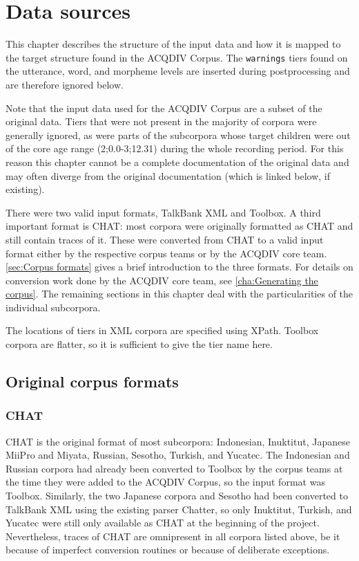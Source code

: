\documentclass[a4paper, 11pt]{book}
\begin{document}
\chapter{Data sources}
\label{cha:Data sources}

This chapter describes the structure of the input data and how it is mapped to the target structure found in the ACQDIV Corpus. The \texttt{warnings} tiers found on the utterance, word, and morpheme levels are inserted during postprocessing and are therefore ignored below. 

Note that the input data used for the ACQDIV Corpus are a subset of the original data. Tiers that were not present in the majority of corpora were generally ignored, as were parts of the subcorpora whose target children were out of the core age range (2;0.0-3;12.31) during the whole recording period. For this reason this chapter cannot be a complete documentation of the original data and may often diverge from the original documentation (which is linked below, if existing).

There were two valid input formats, TalkBank XML and Toolbox. A third important format is CHAT: most corpora were originally formatted as CHAT and still contain traces of it. These were converted from CHAT to a valid input format either by the respective corpus teams or by the ACQDIV core team. \autoref{sec:Corpus formats} gives a brief introduction to the three formats. For details on conversion work done by the ACQDIV core team, see \autoref{cha:Generating the corpus}. The remaining sections in this chapter deal with the particularities of the individual subcorpora. 

The locations of tiers in XML corpora are specified using XPath. Toolbox corpora are flatter, so it is sufficient to give the tier name here. 


\section{Original corpus formats}
\label{sec:Corpus formats}

\subsection{CHAT}
\label{subsec:CHAT}

CHAT is the original format of most subcorpora: Indonesian, Inuktitut, Japanese MiiPro and Miyata, Russian, Sesotho, Turkish, and Yucatec. The Indonesian and
Russian corpora had already been converted to Toolbox by the corpus teams at the time they were added to the ACQDIV Corpus, so the input format was Toolbox.
Similarly, the two Japanese corpora and Sesotho had been converted to TalkBank XML using the existing parser Chatter, 
so only Inuktitut, Turkish, and Yucatec were still only available as CHAT at the beginning of the project. Nevertheless, traces of CHAT are omnipresent in all corpora listed above, be it because of imperfect conversion routines or because of deliberate exceptions. 
\end{document}
